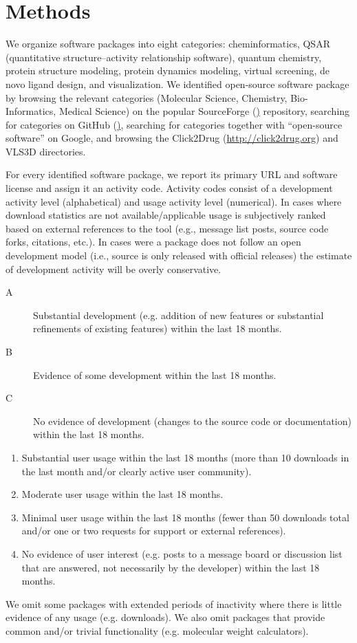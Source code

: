 \section{Methods}

We organize software packages into eight categories: cheminformatics, QSAR (quantitative structure–activity relationship software), quantum chemistry, protein structure modeling, protein dynamics modeling, virtual screening, de novo ligand design, and visualization.
We identified open-source software package by browsing the relevant categories (Molecular Science, Chemistry, Bio-Informatics, Medical Science) on the popular SourceForge (\href{http://sourceforge.net}) repository, searching for categories on GitHub (\href{http://github.com}), searching for categories together with ``open-source software'' on Google, and browsing the Click2Drug (\url{http://click2drug.org}) and VLS3D \cite{Villoutreix_2013} directories.

For every identified software package, we report its primary URL and software license and assign it an activity code. Activity codes consist of a development activity level (alphabetical) and usage activity level (numerical). In cases where download statistics are not available/applicable usage is subjectively ranked based on external references to the tool (e.g., message list posts, source code forks, citations, etc.).  In cases were a package does not follow an open development model (i.e., source is only released with official releases) the estimate of development activity will be overly conservative.

\begin{description}
  \item[A] Substantial development (e.g. addition of new features or substantial refinements of existing features) within the last 18 months.
  \item[B] Evidence of some development within the last 18 months.
  \item[C] No evidence of development (changes to the source code or documentation) within the last 18 months.
\end{description}
\begin{enumerate}
  \item Substantial user usage within the last 18 months (more than 10 downloads in the last month and/or clearly active user community).
  \item Moderate user usage within the last 18 months.
    \item Minimal user usage within the last 18 months (fewer than 50 downloads total and/or one or two requests for support or external references).
  \item No evidence of user interest (e.g. posts to a message board or discussion list that are answered, not necessarily by the developer) within the last 18 months.
\end{enumerate}

We omit some packages with extended periods of inactivity where there is little evidence of any usage (e.g. downloads).  We also omit packages that provide common and/or trivial functionality (e.g. molecular weight calculators).  



 
 

  
  